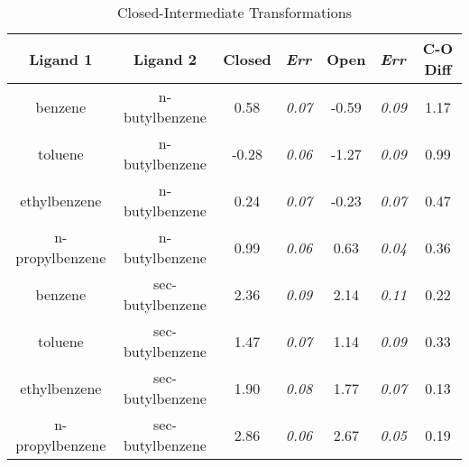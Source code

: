 \documentclass[T4paper.tex]{subfiles}
\begin{document}
\begin{table}[!htb]
\centering
\caption{Closed-Intermediate Transformations}
\label{tbl:C-I}
\begin{tabular}{|c|c|c|l|c|l|c|}
\hline
\textbf{Ligand 1}                       & \textbf{Ligand 2}                        & {\color[HTML]{800080} \textbf{Closed}} & {\color[HTML]{800080} \textit{Err}} & {\color[HTML]{008000} \textbf{Open}} & {\color[HTML]{008000} \textit{Err}} & \textbf{C-O Diff}            \\ \hline
\cellcolor[HTML]{800080}benzene         & \cellcolor[HTML]{00FFFF}n-butylbenzene   & 0.58                                   & \textit{0.07}                       & -0.59                                & \textit{0.09}                       & \cellcolor[HTML]{FFCCC9}1.17 \\ \hline
\cellcolor[HTML]{800080}toluene         & \cellcolor[HTML]{00FFFF}n-butylbenzene   & -0.28                                  & \textit{0.06}                       & -1.27                                & \textit{0.09}                       & \cellcolor[HTML]{9AFF99}0.99 \\ \hline
\cellcolor[HTML]{800080}ethylbenzene    & \cellcolor[HTML]{00FFFF}n-butylbenzene   & 0.24                                   & \textit{0.07}                       & -0.23                                & \textit{0.07}                       & \cellcolor[HTML]{9AFF99}0.47 \\ \hline
\cellcolor[HTML]{800080}n-propylbenzene & \cellcolor[HTML]{00FFFF}n-butylbenzene   & 0.99                                   & \textit{0.06}                       & 0.63                                 & \textit{0.04}                       & \cellcolor[HTML]{9AFF99}0.36 \\ \hline
\cellcolor[HTML]{800080}benzene         & \cellcolor[HTML]{00FFFF}sec-butylbenzene & 2.36                                   & \textit{0.09}                       & 2.14                                 & \textit{0.11}                       & \cellcolor[HTML]{9AFF99}0.22 \\ \hline
\cellcolor[HTML]{800080}toluene         & \cellcolor[HTML]{00FFFF}sec-butylbenzene & 1.47                                   & \textit{0.07}                       & 1.14                                 & \textit{0.09}                       & \cellcolor[HTML]{9AFF99}0.33 \\ \hline
\cellcolor[HTML]{800080}ethylbenzene    & \cellcolor[HTML]{00FFFF}sec-butylbenzene & 1.90                                   & \textit{0.08}                       & 1.77                                 & \textit{0.07}                       & \cellcolor[HTML]{9AFF99}0.13 \\ \hline
\cellcolor[HTML]{800080}n-propylbenzene & \cellcolor[HTML]{00FFFF}sec-butylbenzene & 2.86                                   & \textit{0.06}                       & 2.67                                 & \textit{0.05}                       & \cellcolor[HTML]{9AFF99}0.19 \\ \hline
\end{tabular}
\end{table}
\end{document}
